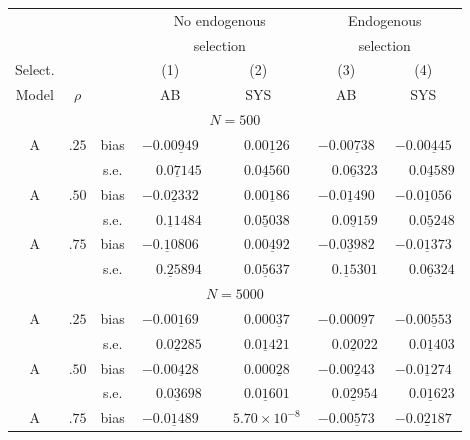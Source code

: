 \begin{tabular}{@{}ccc*{4}{c}@{}}
\toprule
& & & \multicolumn{2}{c}{No endogenous} & \multicolumn{2}{c}{Endogenous} \\
& & & \multicolumn{2}{c}{selection} & \multicolumn{2}{c}{selection} \\
\cmidrule(lr){4-5} \cmidrule(lr){6-7}
Select. & & & (1) & (2) & (3) & (4) \\
Model & $\rho$ & & AB & SYS & AB & SYS \\
\midrule
\midrule
\multicolumn{7}{c}{$N = 500$} \\
\midrule
A & $.25$ & bias & $-0.00\underline{9}49$ & $\phantom{-}0.00\underline{1}26$ & $-0.00\underline{7}38$ & $-0.00\underline{4}45$ \\
& & s.e. & $\phantom{-}0.0\underline{7}145$ & $\phantom{-}0.0\underline{4}560$ & $\phantom{-}0.0\underline{6}323$ & $\phantom{-}0.0\underline{4}589$ \\
A & $.50$ & bias & $-0.0\underline{2}332$ & $\phantom{-}0.00\underline{1}86$ & $-0.0\underline{1}490$ & $-0.0\underline{1}056$ \\
& & s.e. & $\phantom{-}0.\underline{1}1484$ & $\phantom{-}0.0\underline{5}038$ & $\phantom{-}0.0\underline{9}159$ & $\phantom{-}0.0\underline{5}248$ \\
A & $.75$ & bias & $-0.\underline{1}0806$ & $\phantom{-}0.00\underline{4}92$ & $-0.0\underline{3}982$ & $-0.0\underline{1}373$ \\
& & s.e. & $\phantom{-}0.\underline{2}5894$ & $\phantom{-}0.0\underline{5}637$ & $\phantom{-}0.\underline{1}5301$ & $\phantom{-}0.0\underline{6}324$ \\
\midrule
\multicolumn{7}{c}{$N = 5000$} \\
\midrule
A & $.25$ & bias & $-0.00\underline{1}69$ & $\phantom{-}0.000\underline{3}7$ & $-0.000\underline{9}7$ & $-0.00\underline{5}53$ \\
& & s.e. & $\phantom{-}0.0\underline{2}285$ & $\phantom{-}0.0\underline{1}421$ & $\phantom{-}0.0\underline{2}022$ & $\phantom{-}0.0\underline{1}403$ \\
A & $.50$ & bias & $-0.00\underline{4}28$ & $\phantom{-}0.000\underline{2}8$ & $-0.00\underline{2}43$ & $-0.0\underline{1}274$ \\
& & s.e. & $\phantom{-}0.0\underline{3}698$ & $\phantom{-}0.0\underline{1}601$ & $\phantom{-}0.0\underline{2}954$ & $\phantom{-}0.0\underline{1}623$ \\
A & $.75$ & bias & $-0.0\underline{1}489$ & $\phantom{-}5.70 \times 10^{-8}$ & $-0.00\underline{5}73$ & $-0.0\underline{2}187$ \\

\end{tabular}
